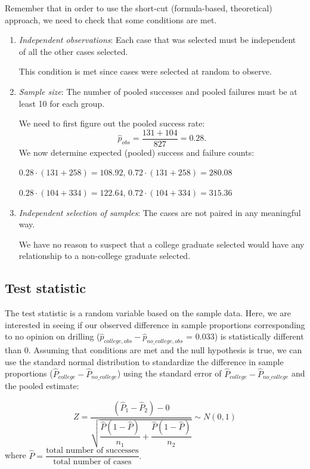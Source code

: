 \documentclass[12pt,]{krantz}
\begin{document}
Remember that in order to use the short-cut (formula-based, theoretical)
approach, we need to check that some conditions are met.

\begin{enumerate}
\def\labelenumi{\arabic{enumi}.}
\item
  \emph{Independent observations}: Each case that was selected must be
  independent of all the other cases selected.

  This condition is met since cases were selected at random to observe.
\item
  \emph{Sample size}: The number of pooled successes and pooled failures
  must be at least 10 for each group.

  We need to first figure out the pooled success rate:
  \[\hat{p}_{obs} = \dfrac{131 + 104}{827} = 0.28.\] We now determine
  expected (pooled) success and failure counts:

  \(0.28 \cdot (131 + 258) = 108.92\),
  \(0.72 \cdot (131 + 258) = 280.08\)

  \(0.28 \cdot (104 + 334) = 122.64\),
  \(0.72 \cdot (104 + 334) = 315.36\)
\item
  \emph{Independent selection of samples}: The cases are not paired in
  any meaningful way.

  We have no reason to suspect that a college graduate selected would
  have any relationship to a non-college graduate selected.
\end{enumerate}

\subsection{Test statistic}\label{test-statistic-2}

The test statistic is a random variable based on the sample data. Here,
we are interested in seeing if our observed difference in sample
proportions corresponding to no opinion on drilling
(\(\hat{p}_{college, obs} - \hat{p}_{no\_college, obs}\) = 0.033) is
statistically different than 0. Assuming that conditions are met and the
null hypothesis is true, we can use the standard normal distribution to
standardize the difference in sample proportions
(\(\hat{P}_{college} - \hat{P}_{no\_college}\)) using the standard error
of \(\hat{P}_{college} - \hat{P}_{no\_college}\) and the pooled
estimate:

\[ Z =\dfrac{ (\hat{P}_1 - \hat{P}_2) - 0}{\sqrt{\dfrac{\hat{P}(1 - \hat{P})}{n_1} + \dfrac{\hat{P}(1 - \hat{P})}{n_2} }} \sim N(0, 1) \]
where
\(\hat{P} = \dfrac{\text{total number of successes} }{ \text{total number of cases}}.\)
\end{document}

